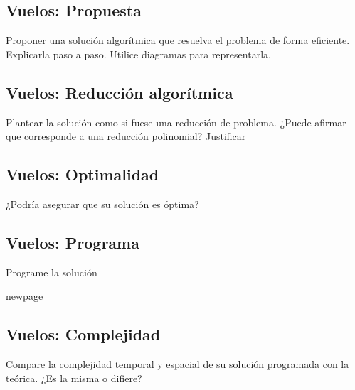 \documentclass[titlepage,a4paper]{article}
\begin{document}
\setcounter{subsection}{0}%
\renewcommand{\thesubsection}{\arabic{subsection}}%

\newpage\subsection{Vuelos: Propuesta}\label{sec:parte1_1}
\begin{tcolorbox}[colback=blue!5!white,colframe=blue!75!black,title=Enunciado P1.1]
    Proponer una solución algorítmica que resuelva el problema de forma eficiente. Explicarla paso a paso. Utilice diagramas para representarla.
\end{tcolorbox}



\filbreak
\subsection{Vuelos: Reducción algorítmica}\label{sec:parte1_2}
\begin{tcolorbox}[colback=blue!5!white,colframe=blue!75!black,title=Enunciado P1.2]
    Plantear la solución como si fuese una reducción de problema.
    ¿Puede afirmar que corresponde a una reducción polinomial? Justificar
\end{tcolorbox}



\filbreak\subsection{Vuelos: Optimalidad}\label{sec:parte1_3}
\begin{tcolorbox}[colback=blue!5!white,colframe=blue!75!black,title=Enunciado P1.3]
    ¿Podría asegurar que su solución es óptima?
\end{tcolorbox}



\newpage\subsection{Vuelos: Programa}\label{sec:parte1_4}
\begin{tcolorbox}[colback=blue!5!white,colframe=blue!75!black,title=Enunciado P1.4]
    Programe la solución
\end{tcolorbox}



newpage\subsection{Vuelos: Complejidad}\label{sec:parte1_5}
\begin{tcolorbox}[colback=blue!5!white,colframe=blue!75!black,title=Enunciado P1.5]
    Compare la complejidad temporal y espacial de su solución programada con la teórica.
    ¿Es la misma o difiere?
\end{tcolorbox}
\end{document}
